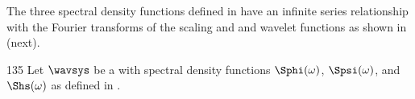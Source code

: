 The three spectral density functions defined in  
have an infinite series relationship with the Fourier transforms of the scaling and
and wavelet functions as shown in  (next).
\begin{lemma}
\label{lem:SSS}
\citep{chui}{135}
Let $\wavsys$ be a 
with spectral density functions $\Sphi(\omega)$, $\Spsi(\omega)$, and $\Shs(\omega)$
as defined in .
\end{lemma}

